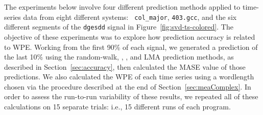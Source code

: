 The experiments below involve four different prediction methods
applied to time-series data from eight different systems: {\tt
  col\_major}, {\tt 403.gcc}, and the six different segments of the
{\tt dgesdd} signal in Figure~\ref{fig:svd-ts-colored}.  The objective
of these experiments was to explore how prediction accuracy is related
to WPE.
%
%
Working from the first 90\% of each signal, we generated a prediction
of the last 10\% using the random-walk, \naive, \arima, and LMA
prediction methods, as described in Section~\ref{sec:accuracy}, then
calculated the MASE value of those predictions.  We also calculated
the WPE of each time series using a wordlength chosen via the
procedure described at the end of Section~\ref{sec:meaComplex}.  In
order to assess the run-to-run variability of these results, we
repeated all of these calculations on 15 separate trials: i.e., 15
different runs of each program.


